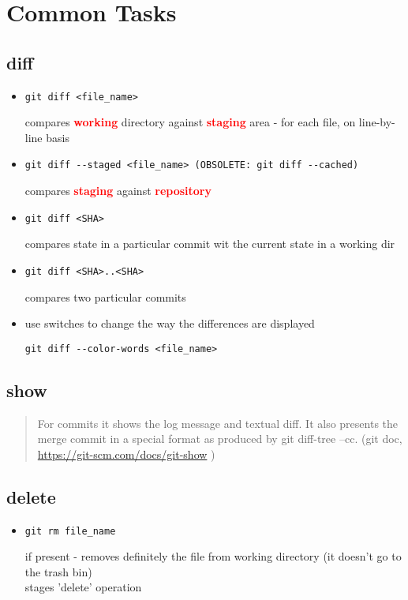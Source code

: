 \documentclass{report}
\begin{document}
\chapter{Common Tasks}
\section{diff}
\begin{itemize}
\item \begin{verbatim}
git diff <file_name>
\end{verbatim}
compares \textcolor{red}{\textbf{working}} directory against \textcolor{red}{\textbf{staging}} area - for each file, on line-by-line basis
\item \begin{verbatim}
git diff --staged <file_name> (OBSOLETE: git diff --cached)
\end{verbatim}
compares \textcolor{red}{\textbf{staging}} against \textcolor{red}{\textbf{repository}}

\item \begin{verbatim}
git diff <SHA>
\end{verbatim}
compares state in a particular commit wit the current state in a working dir

\item \begin{verbatim}
git diff <SHA>..<SHA>\end{verbatim}
compares two particular commits

\item use switches to change the way the differences are displayed
\begin{lstlisting}
git diff --color-words <file_name>
\end{lstlisting}
\end{itemize}

\section{show}
\begin{quote}
For commits it shows the log message and textual diff. It also presents the merge commit in a special format as produced by git diff-tree --cc. (git doc, \url{https://git-scm.com/docs/git-show} )
\end{quote}

\section{delete}
\begin{itemize}
\item \begin{verbatim}
git rm file_name
\end{verbatim}
if present - removes definitely the file from working directory (it doesn't go to the trash bin)\\
stages 'delete' operation
\end{itemize}
\end{document}
